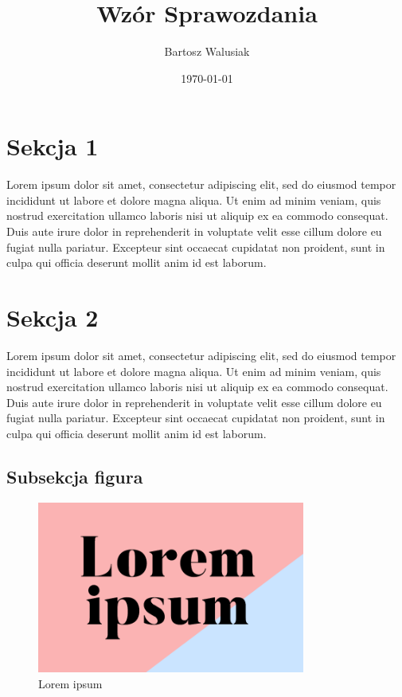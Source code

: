 \documentclass[a4paper,12pt]{article}
\begin{document}
    \title{Wzór Sprawozdania}
    \author{Bartosz Walusiak}
    \date{\today}
    \maketitle

    \tableofcontents

    \newpage
    \section{Sekcja 1}\label{sec:sec-1}
    Lorem ipsum dolor sit amet, consectetur adipiscing elit, sed do eiusmod tempor incididunt ut labore et dolore magna
    aliqua. Ut enim ad minim veniam, quis nostrud exercitation ullamco laboris nisi ut aliquip ex ea commodo consequat.
    Duis aute irure dolor in reprehenderit in voluptate velit esse cillum dolore eu fugiat nulla pariatur. Excepteur
    sint occaecat cupidatat non proident, sunt in culpa qui officia deserunt mollit anim id est laborum.

    \newpage
    \section{Sekcja 2}\label{sec:sec-2}
    Lorem ipsum dolor sit amet, consectetur adipiscing elit, sed do eiusmod tempor incididunt ut labore et dolore magna
    aliqua. Ut enim ad minim veniam, quis nostrud exercitation ullamco laboris nisi ut aliquip ex ea commodo consequat.
    Duis aute irure dolor in reprehenderit in voluptate velit esse cillum dolore eu fugiat nulla pariatur. Excepteur
    sint occaecat cupidatat non proident, sunt in culpa qui officia deserunt mollit anim id est laborum. \autocite[3]{WikiLatex}
    \subsection{Subsekcja figura}\label{subsec:fig-1}
    \begin{figure}[h]
        \centering
        \includegraphics[width=250pt]{picture.png}
        \caption{Lorem ipsum}
        \label{fig:lorem}
    \end{figure}
\end{document}
